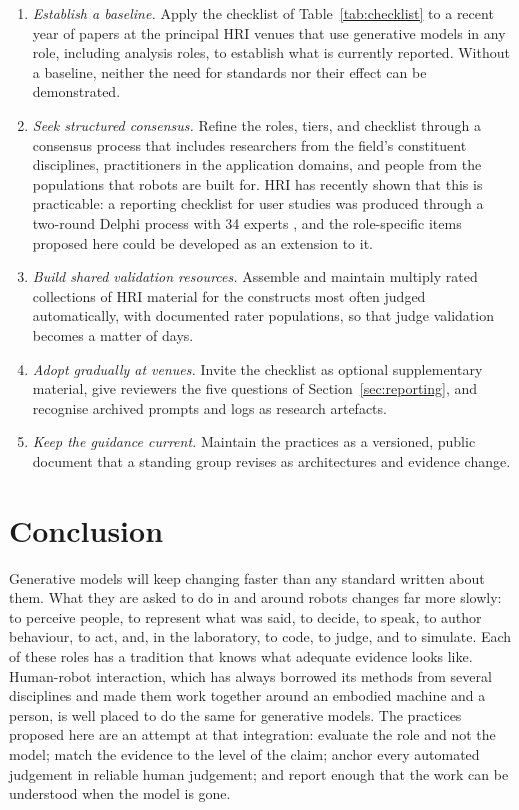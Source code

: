 \begin{enumerate}[leftmargin=1.6em]
\item \emph{Establish a baseline.} Apply the checklist of
Table~\ref{tab:checklist} to a recent year of papers at the principal HRI
venues that use generative models in any role, including analysis roles, to
establish what is currently reported. Without a baseline, neither the need
for standards nor their effect can be demonstrated.
\item \emph{Seek structured consensus.} Refine the roles, tiers, and
checklist through a consensus process that includes researchers from the
field's constituent disciplines, practitioners in the application domains,
and people from the populations that robots are built for. HRI has
recently shown that this is practicable: a reporting checklist for user
studies was produced through a two-round Delphi process with 34 experts
\cite{chandra2026rush}, and the role-specific items proposed here could be
developed as an extension to it.
\item \emph{Build shared validation resources.} Assemble and maintain
multiply rated collections of HRI material for the constructs most often
judged automatically, with documented rater populations, so that judge
validation becomes a matter of days.
\item \emph{Adopt gradually at venues.} Invite the checklist as optional
supplementary material, give reviewers the five questions of
Section~\ref{sec:reporting}, and recognise archived prompts and logs as
research artefacts.
\item \emph{Keep the guidance current.} Maintain the practices as a
versioned, public document that a standing group revises as architectures
and evidence change.
\end{enumerate}

\section{Conclusion}

Generative models will keep changing faster than any standard written about
them. What they are asked to do in and around robots changes far more
slowly: to perceive people, to represent what was said, to decide, to speak,
to author behaviour, to act, and, in the laboratory, to code, to judge, and
to simulate. Each of these roles has a tradition that knows what adequate
evidence looks like. Human-robot interaction, which has always borrowed its
methods from several disciplines and made them work together around an
embodied machine and a person, is well placed to do the same for generative
models. The practices proposed here are an attempt at that integration:
evaluate the role and not the model; match the evidence to the level of the
claim; anchor every automated judgement in reliable human judgement; and
report enough that the work can be understood when the model is gone.
